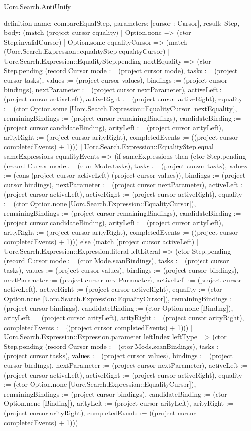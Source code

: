 \begin{lexlean}{Uorc.Search.AntiUnify}
\begin{semanticmodule}
definition{
  name: compareEqualStep,
  parameters: [cursor : Cursor],
  result: Step,
  body: (match (project cursor equality)
    | Option.none => (ctor Step.invalidCursor)
    | Option.some equalityCursor => (match (Uorc.Search.Expression::equalityStep equalityCursor)
      | Uorc.Search.Expression::EqualityStep.pending nextEquality => (ctor Step.pending (record Cursor {mode := (project cursor mode), tasks := (project cursor tasks), values := (project cursor values), bindings := (project cursor bindings), nextParameter := (project cursor nextParameter), activeLeft := (project cursor activeLeft), activeRight := (project cursor activeRight), equality := (ctor Option.some [Uorc.Search.Expression::EqualityCursor] nextEquality), remainingBindings := (project cursor remainingBindings), candidateBinding := (project cursor candidateBinding), arityLeft := (project cursor arityLeft), arityRight := (project cursor arityRight), completedEvents := ((project cursor completedEvents) + 1)}))
      | Uorc.Search.Expression::EqualityStep.equal sameExpressions equalityEvents => (if sameExpressions then (ctor Step.pending (record Cursor {mode := (ctor Mode.tasks), tasks := (project cursor tasks), values := (cons (project cursor activeLeft) (project cursor values)), bindings := (project cursor bindings), nextParameter := (project cursor nextParameter), activeLeft := (project cursor activeLeft), activeRight := (project cursor activeRight), equality := (ctor Option.none [Uorc.Search.Expression::EqualityCursor]), remainingBindings := (project cursor remainingBindings), candidateBinding := (project cursor candidateBinding), arityLeft := (project cursor arityLeft), arityRight := (project cursor arityRight), completedEvents := ((project cursor completedEvents) + 1)})) else (match (project cursor activeLeft)
        | Uorc.Search.Expression::Expression.literal leftLiteral => (ctor Step.pending (record Cursor {mode := (ctor Mode.scanBindings), tasks := (project cursor tasks), values := (project cursor values), bindings := (project cursor bindings), nextParameter := (project cursor nextParameter), activeLeft := (project cursor activeLeft), activeRight := (project cursor activeRight), equality := (ctor Option.none [Uorc.Search.Expression::EqualityCursor]), remainingBindings := (project cursor bindings), candidateBinding := (ctor Option.none [Binding]), arityLeft := (project cursor arityLeft), arityRight := (project cursor arityRight), completedEvents := ((project cursor completedEvents) + 1)}))
        | Uorc.Search.Expression::Expression.parameter leftIndex leftType => (ctor Step.pending (record Cursor {mode := (ctor Mode.scanBindings), tasks := (project cursor tasks), values := (project cursor values), bindings := (project cursor bindings), nextParameter := (project cursor nextParameter), activeLeft := (project cursor activeLeft), activeRight := (project cursor activeRight), equality := (ctor Option.none [Uorc.Search.Expression::EqualityCursor]), remainingBindings := (project cursor bindings), candidateBinding := (ctor Option.none [Binding]), arityLeft := (project cursor arityLeft), arityRight := (project cursor arityRight), completedEvents := ((project cursor completedEvents) + 1)}))
}
\end{semanticmodule}
\end{lexlean}
